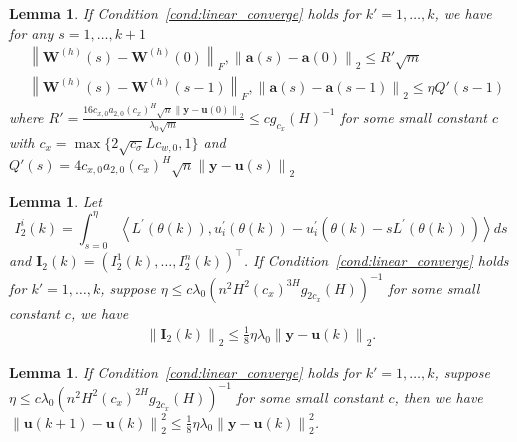 \documentclass[11pt]{article}
\theoremstyle{plain}
\newtheorem{lemma}[thm]{Lemma}
\theoremstyle{definition}
\newcommand{\norm}[1]{\left\| #1 \right\|}
\begin{document}
\begin{lemma} \label{lemma:weights_stability}
	If Condition~\ref{cond:linear_converge} holds for $k'=1,\ldots,k$, we have for any $s =1,\ldots,k+1$
	\begin{align*}
	&\norm{\mathbf{W}^{(h)}(s)-\mathbf{W}^{(h)}(0)}_F, \norm{\mathbf{a}(s)-\mathbf{a}(0)}_2 \le  R'\sqrt{m}\\
	&\norm{\mathbf{W}^{(h)}(s)-\mathbf{W}^{(h)}(s-1)}_F,  \norm{\mathbf{a}(s)-\mathbf{a}(s-1)}_2\le \eta Q'(s-1)
	\end{align*}where $R'=\frac{16c_{x,0}a_{2,0}\left(c_x\right)^H \sqrt{n} \norm{\mathbf{y}-\mathbf{u}(0)}_2}{\lambda_0\sqrt{m}}  \le cg_{c_x}(H)^{-1}$ for some small constant $c$ with $c_x=\max\{2\sqrt{c_{\sigma}}Lc_{w,0},1\}$ and $ Q'(s)= 4c_{x,0}a_{2,0}\left(c_x\right)^{H}\sqrt{n} \norm{\mathbf{y}-\mathbf{u}(s)}_2$

\end{lemma}

\begin{lemma}\label{lemma:small_snd_order_term}
    Let 
    \[
        I_2^i(k) = \int_{s=0}^{\eta}\left\langle L^{\prime}(\theta(k)), u_{i}^{\prime}(\theta(k))-u_{i}^{\prime}\left(\theta(k)-s L^{\prime}(\theta(k))\right)\right\rangle d s
    \]
    and $\mathbf{I}_2(k) = (I_2^1(k), \dots, I_2^n(k))^\top$.
If Condition~\ref{cond:linear_converge} holds for $k'=1,\ldots,k$, suppose $\eta\le c\lambda_0\left(n^{2}H^2(c_x)^{3H}g_{2c_x}(H)\right)^{-1}$ for some small constant $c$, we have \begin{align*}
	\norm{\mathbf{I}_2(k)}_2 \le \frac{1}{8}\eta \lambda_0 \norm{\mathbf{y}-\mathbf{u}(k)}_2.
\end{align*}
\end{lemma}

\begin{lemma}\label{lemma:small_snd_order_term_2}
If Condition~\ref{cond:linear_converge} holds for $k'=1,\ldots,k$, suppose $\eta\le c\lambda_0\left(n^{2}H^2(c_x)^{2H}g_{2c_x}(H)\right)^{-1}$ for some small constant $c$, then we have
$\norm{\mathbf{u}(k+1)-\mathbf{u}(k)}_2^2\le \frac{1}{8}\eta \lambda_0 \norm{\mathbf{y}-\mathbf{u}(k)}_2^2$.

\end{lemma}
\end{document}
